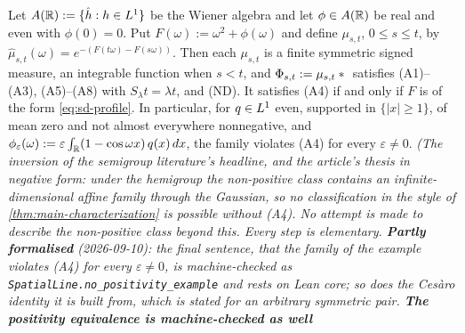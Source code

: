 \begin{proposition}
\label{prop:no-positivity-no-classification}
\notready
Let $A(\mathbb{R}) := \{\hat h : h \in L^1\}$ be the Wiener algebra and let $\phi \in A(\mathbb{R})$ be
real and even with $\phi(0) = 0$. Put $F(\omega) := \omega^2 + \phi(\omega)$ and define
$\mu_{s,t}$, $0 \le s \le t$, by $\hat\mu_{s,t}(\omega) = e^{-(F(t\omega) - F(s\omega))}$. Then
each $\mu_{s,t}$ is a finite symmetric signed measure, an integrable function when $s < t$, and
$\Phi_{s,t} := \mu_{s,t} * {}$ satisfies (A1)--(A3), (A5)--(A8) with
$S_\lambda t = \lambda t$, and (ND). It satisfies (A4) if and only if $F$ is of the form
\ref{eq:sd-profile}. In particular, for $q \in L^1$ even, supported in $\{|x| \ge 1\}$, of
mean zero and not almost everywhere nonnegative, and
$\phi_\varepsilon(\omega) := \varepsilon\int_{\mathbb{R}} (1 - \cos\omega x)\,q(x)\,dx$, the family
violates (A4) for every $\varepsilon \ne 0$.
\statusT\quad\emph{(The inversion of the semigroup literature's headline, and the article's
thesis in negative form: under the hemigroup the non-positive class contains an
infinite-dimensional affine family through the Gaussian, so no classification in the style of
\ref{thm:main-characterization} is possible without (A4). No attempt is made to describe the
non-positive class beyond this. Every step is elementary. \textbf{Partly formalised}
(2026-09-10): the final sentence, that the family of the example violates (A4) for every
$\varepsilon \ne 0$, is machine-checked as \texttt{SpatialLine.no\_positivity\_example} and
rests on Lean core; so does the Ces\`aro identity it is built from, which is stated for an
arbitrary symmetric \Levy{} pair. \textbf{The positivity equivalence is machine-checked as well}
}
\end{proposition}
